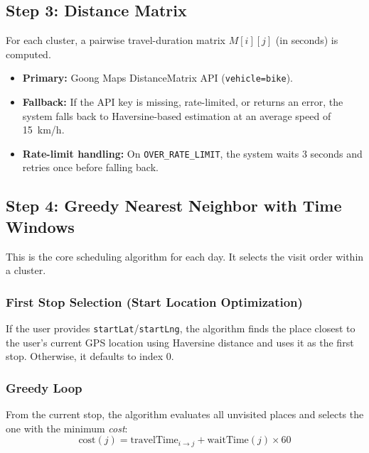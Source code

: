 \documentclass[12pt,a4paper]{report}
\begin{document}
\subsection{Step 3: Distance Matrix}

For each cluster, a pairwise travel-duration matrix $M[i][j]$ (in seconds) is computed.

\begin{itemize}
    \item \textbf{Primary:} Goong Maps DistanceMatrix API (\texttt{vehicle=bike}).
    \item \textbf{Fallback:} If the API key is missing, rate-limited, or returns an error, the system falls back to Haversine-based estimation at an average speed of 15~km/h.
    \item \textbf{Rate-limit handling:} On \texttt{OVER\_RATE\_LIMIT}, the system waits 3 seconds and retries once before falling back.
\end{itemize}

\subsection{Step 4: Greedy Nearest Neighbor with Time Windows}

This is the core scheduling algorithm for each day. It selects the visit order within a cluster.

\subsubsection{First Stop Selection (Start Location Optimization)}
If the user provides \texttt{startLat}/\texttt{startLng}, the algorithm finds the place closest to the user's current GPS location using Haversine distance and uses it as the first stop. Otherwise, it defaults to index 0.

\subsubsection{Greedy Loop}
From the current stop, the algorithm evaluates all unvisited places and selects the one with the minimum \emph{cost}:
\begin{equation}
\text{cost}(j) = \text{travelTime}_{i \to j} + \text{waitTime}(j) \times 60
\end{equation}
\end{document}
